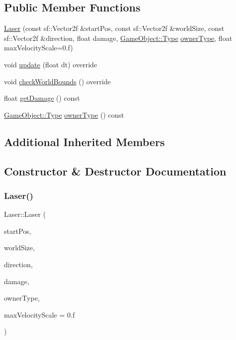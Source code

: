 \subsection*{Public Member Functions}
\begin{DoxyCompactItemize}
\item 
\hyperlink{class_laser_acae004a0d25fdc1c3926bcfd52678f9c}{Laser} (const sf\+::\+Vector2f \&start\+Pos, const sf\+::\+Vector2f \&world\+Size, const sf\+::\+Vector2f \&direction, float damage, \hyperlink{class_game_object_a4bf9e8f660e6a49f1b802c2aa9dd95af}{Game\+Object\+::\+Type} \hyperlink{class_laser_abbda8cd10b6ea38a1be7bd867a902dd9}{owner\+Type}, float max\+Velocity\+Scale=0.f)
\item 
void \hyperlink{class_laser_af692c14903cce59991bdd9cc9f78aeb3}{update} (float dt) override
\item 
void \hyperlink{class_laser_a59c9d2f9bbefdbc978232acf0a1fa978}{check\+World\+Bounds} () override
\item 
float \hyperlink{class_laser_a121266b7a10b80a71304e85421eebc3a}{get\+Damage} () const
\item 
\hyperlink{class_game_object_a4bf9e8f660e6a49f1b802c2aa9dd95af}{Game\+Object\+::\+Type} \hyperlink{class_laser_abbda8cd10b6ea38a1be7bd867a902dd9}{owner\+Type} () const
\end{DoxyCompactItemize}
\subsection*{Additional Inherited Members}


\subsection{Constructor \& Destructor Documentation}
\mbox{\label{class_laser_acae004a0d25fdc1c3926bcfd52678f9c}} 
\subsubsection{\texorpdfstring{Laser()}{Laser()}}
{\footnotesize\ttfamily Laser\+::\+Laser (\begin{DoxyParamCaption}\item[{const sf\+::\+Vector2f \&}]{start\+Pos,  }\item[{const sf\+::\+Vector2f \&}]{world\+Size,  }\item[{const sf\+::\+Vector2f \&}]{direction,  }\item[{float}]{damage,  }\item[{\hyperlink{class_game_object_a4bf9e8f660e6a49f1b802c2aa9dd95af}{Game\+Object\+::\+Type}}]{owner\+Type,  }\item[{float}]{max\+Velocity\+Scale = {\ttfamily 0.f} }\end{DoxyParamCaption})}

